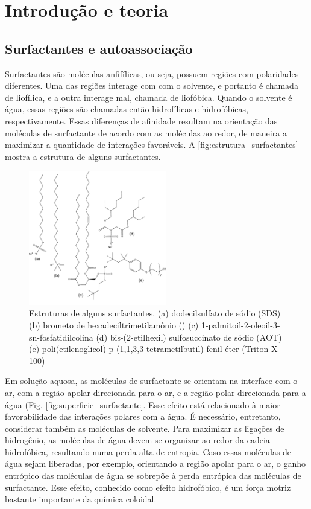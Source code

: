 
\part{Introdução e teoria}

	\chapter{Surfactantes e autoassociação}
	Surfactantes são moléculas anfifílicas, ou seja, possuem regiões com polaridades diferentes. Uma das regiões interage com com o solvente, e portanto é chamada de liofílica, e a outra interage mal, chamada de liofóbica. Quando o solvente é água, essas regiões são chamadas então hidrofílicas e hidrofóbicas, respectivamente. Essas diferenças de afinidade resultam na orientação das moléculas de surfactante de acordo com as moléculas ao redor, de maneira a maximizar a quantidade de interações favoráveis. A  \autoref{fig:estrutura_surfactantes} mostra a estrutura de alguns surfactantes.
	
	\begin{figure}[h]  %
		\centering
		\includegraphics[width=6cm]{./imagens/introducao/estrutura_surfactantes}
		\caption{Estruturas de alguns surfactantes. (a) dodecilsulfato de sódio (SDS) (b) brometo de hexadeciltrimetilamônio (\CTAB) (c) 1-palmitoil-2-oleoil-3-sn-fosfatidilcolina (d) bis-(2-etilhexil) sulfosuccinato de sódio (AOT) (e) poli(etilenoglicol) p-(1,1,3,3-tetrametilbutil)-fenil éter (Triton X-100)}
		\label{fig:estrutura_surfactantes}
	\end{figure} 
	
	Em solução aquosa, as moléculas de surfactante se orientam na interface com o ar, com a região apolar direcionada para o ar, e a região polar direcionada para a água (Fig. \ref{fig:superficie_surfactante}. Esse efeito está relacionado à maior favorabilidade das interações polares com a água. É necessário, entretanto, considerar também as moléculas de solvente. Para maximizar as ligações de hidrogênio, as moléculas de água devem se organizar ao redor da cadeia hidrofóbica, resultando numa perda alta de entropia. Caso essas moléculas de água sejam liberadas, por exemplo, orientando a região apolar para o ar, o ganho entrópico das moléculas de água se sobrepõe à perda entrópica das moléculas de surfactante. Esse efeito, conhecido como efeito hidrofóbico, é um força motriz bastante importante da química coloidal. 
	
